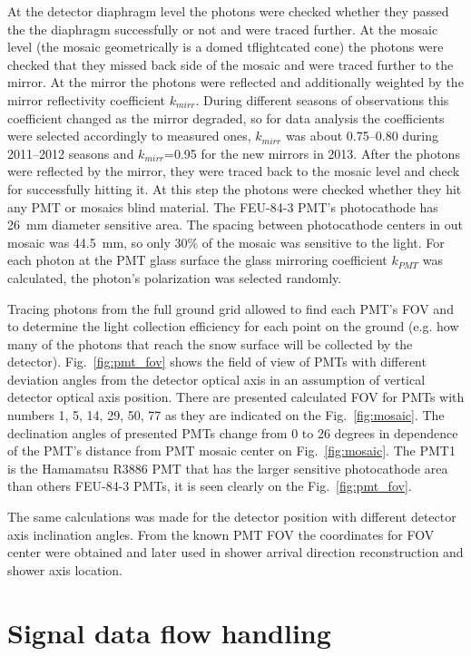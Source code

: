 \documentclass[final,5p,times,twocolumn]{elsarticle}
\begin{document}
At the detector diaphragm level the photons were checked whether they passed the the diaphragm successfully or not and were traced further. At the mosaic level (the mosaic geometrically is a domed {\color{red}tflightcated} cone) the photons were checked that they missed back side of the mosaic and were traced further to the mirror. At the mirror the photons were reflected and additionally weighted by the mirror reflectivity coefficient $k_{mirr}$. During different seasons of observations this coefficient changed as the mirror degraded, so for data analysis the coefficients were selected accordingly to {\color{red} measured ones}, $k_{mirr}$ was about 0.75--0.80 during 2011--2012 seasons and $k_{mirr}$=0.95 for the new mirrors in 2013. After the photons were reflected by the mirror, they were traced back to the mosaic level and check for successfully hitting it. At this step the photons were checked whether they hit any PMT or mosaics blind material. The \mbox{FEU-84-3} PMT's photocathode has 26~mm diameter sensitive area. The spacing between photocathode centers in out mosaic was 44.5~mm, so only 30\% of the mosaic was sensitive to the light. For each photon at the PMT glass surface the glass mirroring coefficient $k_{PMT}$ was calculated, the photon's polarization was selected randomly.

Tracing photons from the full ground grid allowed to find each PMT's FOV and to determine the light collection efficiency for each point on the ground (e.g. how many of the photons that reach the snow surface will be collected by the detector).
Fig.~\ref{fig:pmt_fov} shows the field of view of PMTs with different deviation angles  from the detector optical axis in an assumption of vertical detector optical axis position. There are presented calculated FOV for PMTs with numbers 1, 5, 14, 29, 50, 77 as they are indicated on the Fig.~\ref{fig:mosaic}. The declination angles of presented PMTs change from 0 to 26 degrees in dependence of the PMT's distance from PMT mosaic center on Fig.~\ref{fig:mosaic}. The PMT1 is the Hamamatsu R3886 PMT that has the larger sensitive photocathode area than others FEU-84-3 PMTs, it is seen clearly on the Fig.~\ref{fig:pmt_fov}. 

The same calculations was made for the detector position with different detector axis inclination angles. From the known PMT FOV the coordinates for FOV center were obtained and later used in shower arrival direction reconstruction and shower axis location.

\section{Signal data flow handling}
\end{document}
